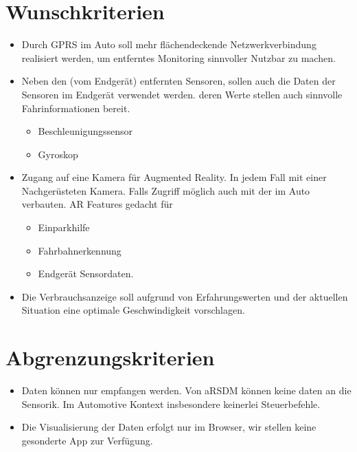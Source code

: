 \documentclass[pflichtenheft.tex]{subfiles}
\begin{document}
\section{Wunschkriterien}


\begin{itemize}
\item Durch GPRS im Auto soll mehr flächendeckende Netzwerkverbindung realisiert werden, um entferntes Monitoring sinnvoller Nutzbar zu machen.
\item Neben den (vom Endgerät) entfernten Sensoren, sollen auch die Daten der Sensoren im Endgerät verwendet werden. deren Werte stellen auch sinnvolle Fahrinformationen bereit.
\begin{itemize}
\item Beschleunigungssensor
\item Gyroskop
\end{itemize}
\item Zugang auf eine Kamera für Augmented Reality. In jedem Fall mit einer Nachgerüsteten Kamera. Falls Zugriff möglich auch mit der im Auto verbauten. AR Features gedacht für
\begin{itemize}
	\item Einparkhilfe
	\item Fahrbahnerkennung
	\item Endgerät Sensordaten.
\end{itemize}
\item Die Verbrauchsanzeige soll aufgrund von Erfahrungswerten und der aktuellen Situation eine optimale Geschwindigkeit vorschlagen.
\end{itemize}

\section{Abgrenzungskriterien}

\begin{itemize}
\item Daten können nur empfangen werden. Von aRSDM können keine daten an die Sensorik. Im Automotive Kontext insbesondere keinerlei Steuerbefehle.
\item Die Visualisierung der Daten erfolgt nur im Browser, wir stellen keine gesonderte App zur Verfügung.
\end{itemize}
\end{document}
